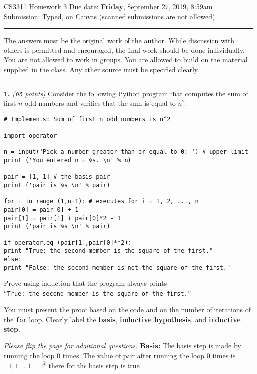 \documentclass[12pt]{article}
\begin{document}
\thispagestyle{empty}

{\large CS3311 Homework 3} \hfill
Due date: {\bf Friday}, September 27, 2019, 8:59am\\
\hfill
Submission: Typed, on Canvas (scanned submissions are not allowed)
\vspace{-0.1in}

\rule{\textwidth}{0.5mm}
\begin{small}
The answers must be the original work of the author. While discussion
with others is permitted and encouraged, the final work should be done
individually. You are not allowed to work in groups. You are allowed to
build on the material supplied in the class. Any other source must be
specified clearly.
\end{small}
\rule{\textwidth}{0.5mm}


{\bf 1.} {\em (65 points)} 
Consider the following Python program that computes the sum of first
$n$ odd numbers and verifies that the sum is equal to $n^2$.

\begin{small}
\begin{lstlisting}
# Implements: Sum of first n odd numbers is n^2

import operator

n = input('Pick a number greater than or equal to 0: ') # upper limit
print ('You entered n = %s. \n' % n)

pair = [1, 1] # the basis pair
print ('pair is %s \n' % pair)

for i in range (1,n+1): # executes for i = 1, 2, ..., n
pair[0] = pair[0] + 1
pair[1] = pair[1] + pair[0]*2 - 1
print ('pair is %s \n' % pair)

if operator.eq (pair[1],pair[0]**2): 
print "True: the second member is the square of the first."
else:
print "False: the second member is not the square of the first."
\end{lstlisting}
\end{small}


Prove using induction that the program always prints\\
``{\tt True: the second member is the square of the first.}''

You must present the proof based on the code and on the number of
iterations of the {\tt for} loop.
Clearly label the {\bf basis}, {\bf
inductive hypothesis}, and {\bf inductive step}.

\hfill {\em Please flip the page for additional questions. }
\newpage
{\bf Basis:} The basis step is made by running the loop $0$ times. The value of pair after running the loop 0 times is $[1,1]$. $1 = 1^2$ there for the basis step is true 
\end{document}
